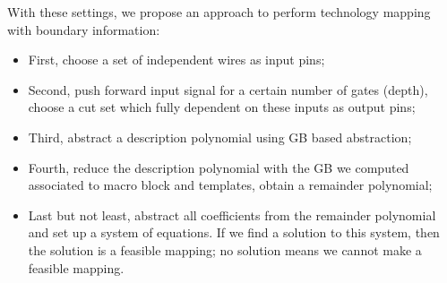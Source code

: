 With these settings, we propose an approach to perform technology mapping with boundary information:
\begin{itemize}
\item First, choose a set of independent wires as input pins;

\item Second, push forward input signal for a certain number of gates (depth), choose a cut set
which fully dependent on these inputs as output pins;

\item Third, abstract a description polynomial using GB based abstraction;

\item Fourth, reduce the description polynomial with the GB we computed associated to macro block 
and templates, obtain a remainder polynomial;

\item Last but not least, abstract all coefficients from the remainder polynomial and set up a system of equations.
If we find a solution to this system, then the solution is a feasible mapping; no solution means we cannot make a
feasible mapping.
\end{itemize}